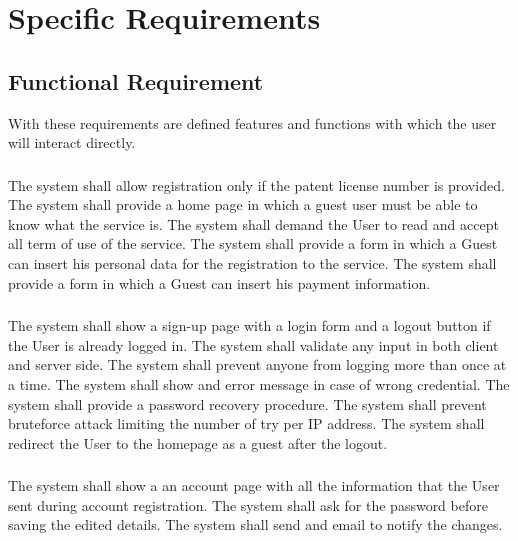 \pagebreak
\section{Specific Requirements}


\subsection{Functional Requirement}

With these requirements are defined features and functions with which
the user will interact directly.



\subsubsection{}
\begin{itemize}
	\reqcounter The system shall allow registration only if the patent license number is provided.
	\reqcounter The system shall provide a home page in which a guest user must be
	able to know what the service is. 
	\reqcounter The system shall demand the User to read and accept all term of use of the service.
	\reqcounter The system shall provide a form in which a Guest can insert his personal data for the registration to the service.
	\reqcounter The system shall provide a form in which a Guest can insert his payment information.
	
	
\end{itemize}

\subsubsection{}
\begin{itemize}
	\reqcounter The system shall show a sign-up page with a login form and a logout button if the User is already logged in.
	\reqcounter The system shall validate any input in both client and server side.
	\reqcounter The system shall prevent anyone from logging more than once at a time.
	\reqcounter The system shall show and error message in case of wrong credential.
	\reqcounter The system shall provide a password recovery procedure.
	\reqcounter The system shall prevent bruteforce attack limiting the number of try per IP address.
	\reqcounter The system shall redirect the User to the homepage as a guest after the logout.
\end{itemize}



\subsubsection{}
\begin{itemize}
	\reqcounter The system shall show a an account page with all the information that the User sent during 
	account registration.
	\reqcounter The system shall ask for the password before saving the edited details.
	\reqcounter The system shall send and email to notify the changes.
\end{itemize}




